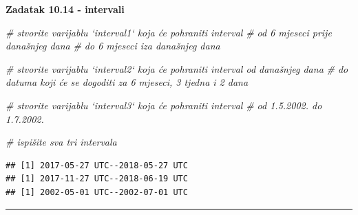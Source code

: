 \documentclass[]{book}
\newenvironment{Shaded}{\begin{snugshade}}{\end{snugshade}}
\newcommand{\KeywordTok}[1]{\textcolor[rgb]{0.13,0.29,0.53}{\textbf{#1}}}
\newcommand{\DecValTok}[1]{\textcolor[rgb]{0.00,0.00,0.81}{#1}}
\newcommand{\StringTok}[1]{\textcolor[rgb]{0.31,0.60,0.02}{#1}}
\newcommand{\CommentTok}[1]{\textcolor[rgb]{0.56,0.35,0.01}{\textit{#1}}}
\newcommand{\OperatorTok}[1]{\textcolor[rgb]{0.81,0.36,0.00}{\textbf{#1}}}
\newcommand{\NormalTok}[1]{#1}
\theoremstyle{definition}
\theoremstyle{definition}
\theoremstyle{definition}
\theoremstyle{remark}
\begin{document}
\textbf{Zadatak 10.14 - intervali}

\begin{Shaded}
\begin{Highlighting}[]
\CommentTok{# stvorite varijablu `interval1` koja će pohraniti interval }
\CommentTok{# od 6 mjeseci prije današnjeg dana}
\CommentTok{# do 6 mjeseci iza današnjeg dana}

\CommentTok{# stvorite varijablu `interval2` koja će pohraniti interval od današnjeg dana}
\CommentTok{# do datuma koji će se dogoditi za 6 mjeseci, 3 tjedna i 2 dana}

\CommentTok{# stvorite varijablu `interval3` koja će pohraniti interval }
\CommentTok{# od 1.5.2002. do 1.7.2002.}

\CommentTok{# ispišite sva tri intervala}
\end{Highlighting}
\end{Shaded}

\begin{Shaded}
\end{Shaded}

\begin{verbatim}
## [1] 2017-05-27 UTC--2018-05-27 UTC
## [1] 2017-11-27 UTC--2018-06-19 UTC
## [1] 2002-05-01 UTC--2002-07-01 UTC
\end{verbatim}

\begin{center}\rule{0.5\linewidth}{\linethickness}\end{center}
\end{document}
